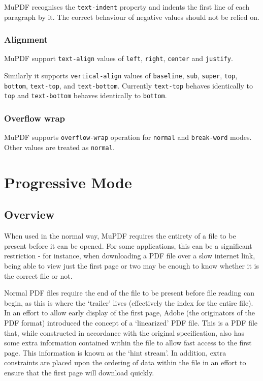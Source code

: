 \documentclass[oneside]{book}
\begin{document}
MuPDF recognises the \texttt{text-indent} property and indents the first line of each paragraph by it. The correct behaviour of negative values should not be relied on.

\subsection{Alignment}

MuPDF support \texttt{text-align} values of \texttt{left}, \texttt{right}, \texttt{center} and \texttt{justify}.

Similarly it supports \texttt{vertical-align} values of \texttt{baseline}, \texttt{sub}, \texttt{super}, \texttt{top}, \texttt{bottom}, \texttt{text-top}, and \texttt{text-bottom}. Currently \texttt{text-top} behaves identically to \texttt{top} and \texttt{text-bottom} behaves identically to \texttt{bottom}.

\subsection{Overflow wrap}

MuPDF supports \texttt{overflow-wrap} operation for \texttt{normal} and \texttt{break-word} modes. Other values are treated as \texttt{normal}.

\chapter{Progressive Mode}
\label{ProgressiveMode}

\section{Overview}

When used in the normal way, MuPDF requires the entirety of a file to be present before it can be opened. For some applications, this can be a significant restriction - for instance, when downloading a PDF file over a slow internet link, being able to view just the first page or two may be enough to know whether it is the correct file or not.

Normal PDF files require the end of the file to be present before file reading can begin, as this is where the `trailer' lives (effectively the index for the entire file). In an effort to allow early display of the first page, Adobe (the originators of the PDF format) introduced the concept of a `linearized' PDF file. This is a PDF file that, while constructed in accordance with the original specification, also has some extra information contained within the file to allow fast access to the first page. This information is known as the `hint stream'. In addition, extra constraints are placed upon the ordering of data within the file in an effort to ensure that the first page will download quickly.
\end{document}
